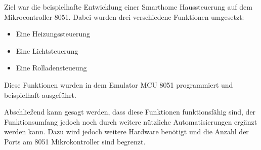 Ziel war die beispielhafte Entwicklung einer Smarthome Haussteuerung auf dem Mikrocontroller 8051. Dabei wurden drei verschiedene Funktionen umgesetzt:

\begin{itemize}
	\item {Eine Heizungssteuerung}
	\item {Eine Lichtsteuerung}
	\item {Eine Rolladensteueung}
\end{itemize}

Diese Funktionen wurden in dem Emulator MCU 8051 programmiert und beispielhaft ausgeführt.


Abschließend kann gesagt werden, dass diese Funktionen funktionsfähig sind, der Funktionsumfang jedoch noch durch weitere nützliche Automatisierungen ergänzt werden kann. Dazu wird jedoch weitere Hardware benötigt und die Anzahl der Ports am 8051 Mikrokontroller sind begrenzt.

